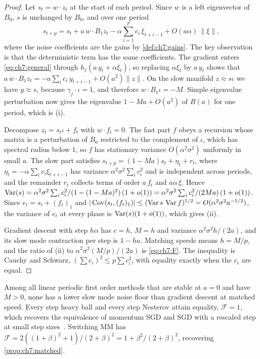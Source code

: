 \begin{proof}
Let $s_t=w\cdot z_t$ at the start of each period. Since $w$ is a left
eigenvector of $B_0$, $s$ is unchanged by $B_0$, and over one period
\[
  s_{t+p}=s_t+a\,w\cdot B_1z_t-\alpha\sum_{i=1}^p c_i\,\xi_{t+i-1}+O(a\alpha)\,\|\xi\|,
\]
where the noise coefficients are the gains by \cref{def:ch7:gains}. The key
observation is that the deterministic term has the same coefficients. The
gradient enters \eqref{eq:ch7:general} through $h_j(a\,y_t+\alpha\xi_t)$,
so replacing $\alpha\xi_t$ by $a\,y_t$ shows that $a\,w\cdot B_1z_t=-a\sum_i
c_i\,y_{t+i-1}+O(a^2)\|z\|$. On the slow manifold $z\approx s\iota$ we have
$y\approx s$, because $\gamma_j\cdot\iota=1$, and therefore
$w\cdot B_1\iota=-M$. Simple eigenvalue perturbation now gives the
eigenvalue $1-Ma+O(a^2)$ of $B(a)$ for one period, which is (i).

Decompose $z_t=s_t\iota+f_t$ with $w\cdot f_t=0$. The fast part $f$ obeys a
recursion whose matrix is a perturbation of $B_0$ restricted to the complement
of $\iota$, which has spectral radius below $1$, so $f$ has stationary
variance $O(\alpha^2\sigma^2)$ uniformly in small $a$. The slow part satisfies
$s_{t+p}=(1-Ma)s_t+\eta_t+r_t$, where $\eta_t=-\alpha\sum_ic_i\xi_{t+i-1}$ has
variance $\alpha^2\sigma^2\sum_ic_i^2$ and is independent across periods, and
the remainder $r_t$ collects terms of order $a\,f_t$ and $a\alpha\,\xi$. Hence
$\operatorname{Var}(s)=\alpha^2\sigma^2\sum_ic_i^2/(1-(1-Ma)^2)\,(1+o(1))
=\alpha^2\sigma^2\sum_ic_i^2/(2Ma)\,(1+o(1))$. Since $e_t=s_t+(f_t)_1$ and
$|\operatorname{Cov}(s_t,(f_t)_1)|\le(\operatorname{Var} s\,\operatorname{Var} f)^{1/2}=O(\alpha^2\sigma^2a^{-1/2})$, the variance of
$e_t$ at every phase is $\operatorname{Var}(s)(1+o(1))$, which gives (ii).

Gradient descent with step $h\alpha$ has $c=h$, $M=h$ and variance
$\alpha^2\sigma^2h/(2a)$, and its slow mode contraction per step is $1-ha$.
Matching speeds means $h=M/p$, and the ratio of (ii) to
$\alpha^2\sigma^2(M/p)/(2a)$ is \eqref{eq:ch7:F}. The inequality is Cauchy and
Schwarz, $(\sum c_i)^2\le p\sum c_i^2$, with equality exactly when the $c_i$
are equal.
\end{proof}

\begin{corollary}
\label{cor:ch7:nobeat}
Among all linear periodic first order methods that are stable at $a=0$ and have $M>0$, none has a lower slow
mode noise floor than gradient descent at matched speed. Every step heavy ball
and every step Nesterov attain equality, $\mathcal F=1$, which recovers the
equivalence of momentum SGD and SGD with a rescaled step at small step
sizes~\cite{yuan2016}. Switching MM has $\mathcal F=2((1+\beta)^2+1)/(2+\beta)^2
=1+\beta^2/(2+\beta)^2$, recovering \cref{prop:ch7:matched}.
\end{corollary}

